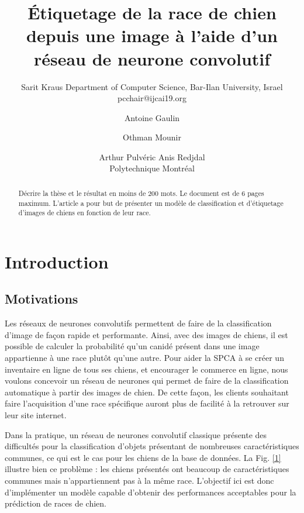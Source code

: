 \documentclass{article}
\title{Étiquetage de la race de chien depuis une image à l'aide d'un réseau de neurone convolutif}
\author{
    Sarit Kraus
    \affiliations
    Department of Computer Science, Bar-Ilan University, Israel \emails
    pcchair@ijcai19.org
}
\author{
Antoine Gaulin\and
Othman Mounir\and
Arthur Pulvéric\And
Anis Redjdal\\
\affiliations
Polytechnique Montréal\\
}
\begin{document}
\maketitle

\begin{abstract}
Décrire la thèse et le résultat en moins de 200 mots. Le document est de 6 pages maximum.
L'article a pour but de présenter un modèle de classification et d'étiquetage d'images de chiens en fonction de leur race.
\end{abstract}

\section{Introduction}

\subsection{Motivations}

Les réseaux de neurones convolutifs permettent de faire de la classification d'image de façon rapide et performante. Ainsi, avec des images de chiens, il est possible de calculer la probabilité qu'un canidé présent dans une image appartienne à une race plutôt qu’une autre. Pour aider la SPCA à se créer un inventaire en ligne de tous ses chiens, et encourager le commerce en ligne, nous voulons concevoir un réseau de neurones qui permet de faire de la classification automatique à partir des images de chien. De cette façon, les clients souhaitant faire l'acquisition d'une race spécifique auront plus de facilité à la retrouver sur leur site internet.

Dans la pratique, un réseau de neurones convolutif classique présente des difficultés pour la classification d’objets présentant de nombreuses caractéristiques communes, ce qui est le cas pour les chiens de la base de données. La Fig. \ref{1} illustre bien ce problème : les chiens présentés ont beaucoup de caractéristiques communes mais n’appartiennent pas à la même race. L’objectif ici est donc d’implémenter un modèle capable d’obtenir des performances acceptables pour la prédiction de races de chien.
\end{document}
